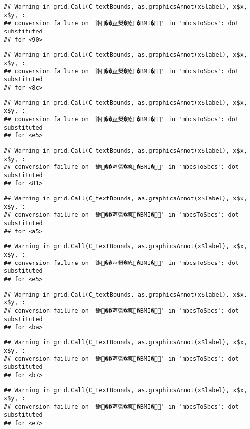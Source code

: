 \documentclass[
]{article}
\begin{document}
\begin{verbatim}
## Warning in grid.Call(C_textBounds, as.graphicsAnnot(x$label), x$x, x$y, :
## conversion failure on '銝��亙熒�瘜�BMI�' in 'mbcsToSbcs': dot substituted
## for <90>
\end{verbatim}

\begin{verbatim}
## Warning in grid.Call(C_textBounds, as.graphicsAnnot(x$label), x$x, x$y, :
## conversion failure on '銝��亙熒�瘜�BMI�' in 'mbcsToSbcs': dot substituted
## for <8c>
\end{verbatim}

\begin{verbatim}
## Warning in grid.Call(C_textBounds, as.graphicsAnnot(x$label), x$x, x$y, :
## conversion failure on '銝��亙熒�瘜�BMI�' in 'mbcsToSbcs': dot substituted
## for <e5>
\end{verbatim}

\begin{verbatim}
## Warning in grid.Call(C_textBounds, as.graphicsAnnot(x$label), x$x, x$y, :
## conversion failure on '銝��亙熒�瘜�BMI�' in 'mbcsToSbcs': dot substituted
## for <81>
\end{verbatim}

\begin{verbatim}
## Warning in grid.Call(C_textBounds, as.graphicsAnnot(x$label), x$x, x$y, :
## conversion failure on '銝��亙熒�瘜�BMI�' in 'mbcsToSbcs': dot substituted
## for <a5>
\end{verbatim}

\begin{verbatim}
## Warning in grid.Call(C_textBounds, as.graphicsAnnot(x$label), x$x, x$y, :
## conversion failure on '銝��亙熒�瘜�BMI�' in 'mbcsToSbcs': dot substituted
## for <e5>
\end{verbatim}

\begin{verbatim}
## Warning in grid.Call(C_textBounds, as.graphicsAnnot(x$label), x$x, x$y, :
## conversion failure on '銝��亙熒�瘜�BMI�' in 'mbcsToSbcs': dot substituted
## for <ba>
\end{verbatim}

\begin{verbatim}
## Warning in grid.Call(C_textBounds, as.graphicsAnnot(x$label), x$x, x$y, :
## conversion failure on '銝��亙熒�瘜�BMI�' in 'mbcsToSbcs': dot substituted
## for <b7>
\end{verbatim}

\begin{verbatim}
## Warning in grid.Call(C_textBounds, as.graphicsAnnot(x$label), x$x, x$y, :
## conversion failure on '銝��亙熒�瘜�BMI�' in 'mbcsToSbcs': dot substituted
## for <e7>
\end{verbatim}
\end{document}

